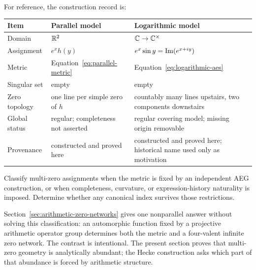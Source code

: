 For reference, the construction record is:
\begin{center}
\small
\begin{tabular}{p{}p{}p{}}
\toprule
Item & Parallel model & Logarithmic model \\
\midrule
Domain & $\mathbb{R}^2$ & $\mathbb{C}\to\mathbb{C}^\times$ \\
Assignment & $e^xh(y)$ & $e^x\sin y=\operatorname{Im}(e^{x+iy})$ \\
Metric & Equation~\eqref{eq:parallel-metric} &
Equation~\eqref{eq:logarithmic-aes} \\
Singular set & empty & empty \\
Zero topology & one line per simple zero of $h$ & countably many lines upstairs,
two components downstairs \\
Global status & regular; completeness not asserted & regular covering model;
missing origin removable \\
Provenance & constructed and proved here & constructed and proved here; historical
name used only as motivation \\
\bottomrule
\end{tabular}
\end{center}

\begin{problem}
\label{prob:natural-multizero}
Classify multi-zero assignments when the metric is fixed by an independent AEG
construction, or when completeness, curvature, or expression-history naturality is
imposed.  Determine whether any canonical index survives those restrictions.
\end{problem}

Section~\ref{sec:arithmetic-zero-networks} gives one nonparallel answer without
solving this classification: an automorphic function fixed by a projective
arithmetic operator group determines both the metric and a four-valent infinite
zero network.  The contrast is intentional.  The present section proves that
multi-zero geometry is analytically abundant; the Hecke construction asks which
part of that abundance is forced by arithmetic structure.
